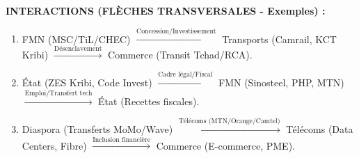 \documentclass[11pt]{article}
\begin{document}
\begin{exoresolu}
\textbf{INTERACTIONS (FLÈCHES TRANSVERSALES - Exemples) :}
\begin{enumerate}
    \item \textcolor{poporange}{FMN (MSC/TiL/CHEC)} $\xrightarrow{\text{Concession/Investissement}}$ \textcolor{popblue}{Transports (Camrail, KCT Kribi)} $\xrightarrow{\text{Désenclavement}}$ \textcolor{popred}{Commerce (Transit Tchad/RCA)}.
    \item \textcolor{popgreen}{État (ZES Kribi, Code Invest)} $\xrightarrow{\text{Cadre légal/Fiscal}}$ \textcolor{poporange}{FMN (Sinosteel, PHP, MTN)} $\xrightarrow{\text{Emploi/Transfert tech}}$ \textcolor{popgreen}{État (Recettes fiscales)}.
    \item \textcolor{popgreen}{Diaspora (Transferts MoMo/Wave)} $\xrightarrow{\text{Télécoms (MTN/Orange/Camtel)}}$ \textcolor{popblue}{Télécoms (Data Centers, Fibre)} $\xrightarrow{\text{Inclusion financière}}$ \textcolor{popred}{Commerce (E-commerce, PME)}.
\end{enumerate}
\end{exoresolu}
\end{document}
